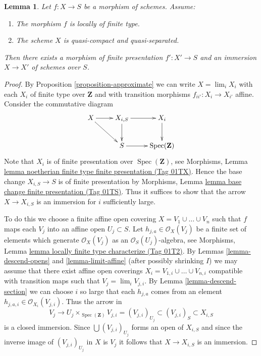 \documentclass{amsart}
\theoremstyle{plain}
\newtheorem{lemma}[subsection]{Lemma}
\theoremstyle{definition}
\theoremstyle{remark}
\numberwithin{equation}{subsection}
\def\lim{\mathop{\mathrm{lim}}\nolimits}
\def\Spec{\mathop{\mathrm{Spec}}}
\begin{document}
\begin{lemma}
\label{lemma-locally-finite-type-in-finite-presentation}
Let $f : X \to S$ be a morphism of schemes.
Assume:
\begin{enumerate}
\item The morphism $f$ is locally of finite type.
\item The scheme $X$ is quasi-compact and quasi-separated.
\end{enumerate}
Then there exists a morphism of finite presentation
$f' : X' \to S$ and an immersion $X \to X'$ of schemes over $S$.
\end{lemma}

\begin{proof}
By
Proposition \ref{proposition-approximate}
we can write
$X = \lim_i X_i$ with each $X_i$ of finite type over $\mathbf{Z}$ and
with transition morphisms $f_{ii'} : X_i \to X_{i'}$ affine.
Consider the commutative diagram
$$
\xymatrix{
X \ar[r] \ar[rd] & X_{i, S} \ar[r] \ar[d] & X_i \ar[d] \\
& S \ar[r] & \Spec(\mathbf{Z})
}
$$
Note that $X_i$ is of finite presentation over $\Spec(\mathbf{Z})$, see
Morphisms,
Lemma \href{https://stacks.math.columbia.edu/tag/01TX}{lemma noetherian finite type finite presentation (Tag 01TX)}.
Hence the base change $X_{i, S} \to S$ is of finite presentation by
Morphisms, Lemma \href{https://stacks.math.columbia.edu/tag/01TS}{lemma base change finite presentation (Tag 01TS)}.
Thus it suffices to show that the arrow $X \to X_{i, S}$ is an
immersion for $i$ sufficiently large.

\medskip\noindent
To do this we choose a finite affine open covering
$X = V_1 \cup \ldots \cup V_n$ such that
$f$ maps each $V_j$ into an affine open $U_j \subset S$.
Let $h_{j, a} \in \mathcal{O}_X(V_j)$ be a finite
set of elements which generate $\mathcal{O}_X(V_j)$ as
an $\mathcal{O}_S(U_j)$-algebra, see
Morphisms, Lemma \href{https://stacks.math.columbia.edu/tag/01T2}{lemma locally finite type characterize (Tag 01T2)}.
By Lemmas \ref{lemma-descend-opens} and \ref{lemma-limit-affine}
(after possibly shrinking $I$) we may assume that
there exist affine open coverings
$X_i = V_{1, i} \cup \ldots \cup V_{n, i}$
compatible with transition maps such that $V_j = \lim_i V_{j, i}$.
By Lemma \ref{lemma-descend-section} we can choose $i$ so large that each
$h_{j, a}$ comes from an element
$h_{j, a, i} \in \mathcal{O}_{X_i}(V_{j, i})$.
Thus the arrow in
$$
V_j \longrightarrow U_j \times_{\Spec(\mathbf{Z})} V_{j, i} =
(V_{j, i})_{U_j} \subset (V_{j, i})_S \subset X_{i, S}
$$
is a closed immersion. Since $\bigcup (V_{j, i})_{U_j}$ forms an open of
$X_{i, S}$ and since the inverse image of $(V_{j, i})_{U_j}$ in $X$
is $V_j$ it follows that $X \to X_{i, S}$ is an immersion.
\end{proof}
\end{document}
